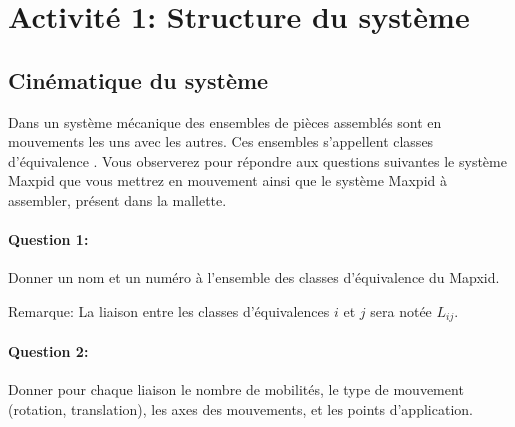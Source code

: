 


\section{Activité 1: Structure du système}

\subsection{Cinématique du système}

Dans un système mécanique des ensembles de pièces assemblés sont en mouvements les uns avec les autres. Ces ensembles s'appellent \og classes d'équivalence \fg. Vous observerez pour répondre aux questions suivantes le système Maxpid que vous mettrez en mouvement ainsi que le système Maxpid à assembler, présent dans la mallette.

\paragraph{Question 1:} Donner un nom et un  numéro à l'ensemble des classes d'équivalence du Mapxid.

Remarque: La liaison entre les classes d'équivalences $i$ et $j$ sera notée $L_{ij}$.

\paragraph{Question 2:} Donner pour chaque liaison le nombre de mobilités, le type de mouvement (rotation, translation), les axes des mouvements, et les points d'application.

